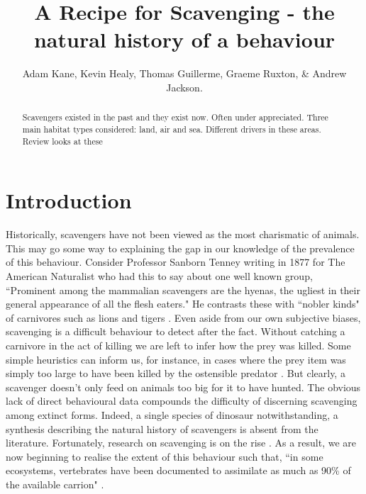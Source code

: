 \documentclass[a4paper,12pt]{article}
\title{A Recipe for Scavenging - the natural history of a behaviour}
\author{Adam Kane, Kevin Healy, Thomas Guillerme, Graeme Ruxton, \& Andrew Jackson.}
\begin{document}
\maketitle


\begin{abstract}
 Scavengers existed in the past and they exist now. 
 Often under appreciated. 
 Three main habitat types considered: land, air and sea. 
 Different drivers in these areas. 
 Review looks at these 
\end{abstract}

\newpage


\section*{Introduction}
Historically, scavengers have not been viewed as the most charismatic of animals.
This may go some way to explaining the gap in our knowledge of the prevalence of this behaviour.
Consider Professor Sanborn Tenney writing in 1877 for The American Naturalist who had this to say about one well known group, ``Prominent among the mammalian scavengers are the hyenas, the ugliest in their general appearance of all the flesh eaters."
He contrasts these with ``nobler kinds" of carnivores such as lions and tigers \citep{tenney1877few}.
Even aside from our own subjective biases, scavenging is a difficult behaviour to detect after the fact.
Without catching a carnivore in the act of killing we are left to infer how the prey was killed.
Some simple heuristics can inform us, for instance, in cases where the prey item was simply too large to have been killed by the ostensible predator \citep{pobiner2008paleoecological}.
But clearly, a scavenger doesn’t only feed on animals too big for it to have hunted.
The obvious lack of direct behavioural data compounds the difficulty of discerning scavenging among extinct forms.
Indeed, a single species of dinosaur notwithstanding, a synthesis describing the natural history of scavengers is absent from the literature.
Fortunately, research on scavenging is on the rise \citep{manga2006vulture}.
As a result, we are now beginning to realise the extent of this behaviour such that, ``in some ecosystems, vertebrates have been documented to assimilate as much as 90\% of the available carrion" \citep{beasley2015vertebrates}.
\end{document}
